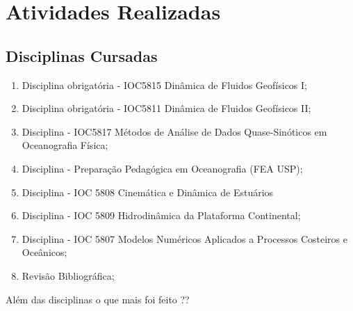 \chapter{Atividades Realizadas}

\section{Disciplinas Cursadas}

\hspace{5mm} 

\begin{enumerate}
    \item Disciplina obrigatória - IOC5815 Dinâmica de Fluidos Geofísicos I;
    \item Disciplina obrigatória - IOC5811 Dinâmica de Fluidos Geofísicos II;
    \item Disciplina - IOC5817 Métodos de Análise de Dados Quase-Sinóticos em Oceanografia Física;
    \item Disciplina - Preparação Pedagógica em Oceanografia (FEA USP);
    \item Disciplina - IOC 5808 Cinemática e Dinâmica de Estuários
    \item Disciplina - IOC 5809 Hidrodinâmica da Plataforma Continental;
    \item Disciplina - IOC 5807 Modelos Numéricos Aplicados a Processos Costeiros e Oceânicos;
    \item Revisão Bibliográfica;
\end{enumerate}

\hspace{5mm} Além das disciplinas o que mais foi feito ??
